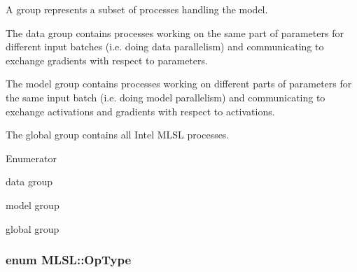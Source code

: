 A group represents a subset of processes handling the model.\par
 The data group contains processes working on the same part of parameters for different input batches (i.\-e. doing data parallelism) and communicating to exchange gradients with respect to parameters.\par
 The model group contains processes working on different parts of parameters for the same input batch (i.\-e. doing model parallelism) and communicating to exchange activations and gradients with respect to activations.\par
 The global group contains all Intel M\-L\-S\-L processes. \begin{Desc}
\item[Enumerator]\par
\begin{description}
\item[{\em 
\hypertarget{namespaceMLSL_a9629292da8a376647d4b14a34cda9b95af88ffdbe7280e91f4567aaa1529209d1}{G\-T\-\_\-\-D\-A\-T\-A}\label{namespaceMLSL_a9629292da8a376647d4b14a34cda9b95af88ffdbe7280e91f4567aaa1529209d1}
}]data group \item[{\em 
\hypertarget{namespaceMLSL_a9629292da8a376647d4b14a34cda9b95a86219d2c56b5d2d980fa1611e8c24353}{G\-T\-\_\-\-M\-O\-D\-E\-L}\label{namespaceMLSL_a9629292da8a376647d4b14a34cda9b95a86219d2c56b5d2d980fa1611e8c24353}
}]model group \item[{\em 
\hypertarget{namespaceMLSL_a9629292da8a376647d4b14a34cda9b95af7f072326039cee9c6a9c0d810c98700}{G\-T\-\_\-\-G\-L\-O\-B\-A\-L}\label{namespaceMLSL_a9629292da8a376647d4b14a34cda9b95af7f072326039cee9c6a9c0d810c98700}
}]global group \end{description}
\end{Desc}
\hypertarget{namespaceMLSL_a1366e5621278eafc7ecb03de012824bf}{
\subsubsection[{Op\-Type}]{\setlength{\rightskip}{0pt plus 5cm}enum {\bf M\-L\-S\-L\-::\-Op\-Type}}}\label{namespaceMLSL_a1366e5621278eafc7ecb03de012824bf}


